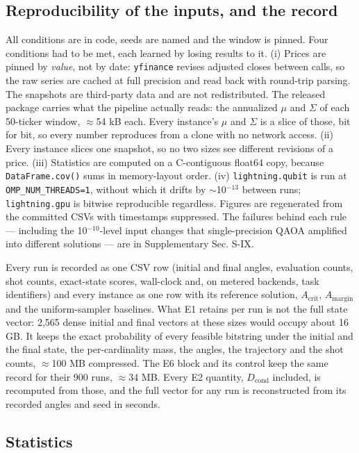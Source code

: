 \documentclass{ieeeaccess}
\begin{document}
\subsection{Reproducibility of the inputs, and the record}


All conditions are in code, seeds are named and the window is pinned. Four conditions had to be met, each learned by losing results to it. (i) Prices are pinned by \textit{value}, not by date: \texttt{yfinance} revises adjusted closes between calls, so the raw series are cached at full precision and read back with round-trip parsing. The snapshots are third-party data and are not redistributed. The released package carries what the pipeline actually reads: the annualized $\mu$ and $\Sigma$ of each 50-ticker window, $\approx$54 kB each. Every instance's $\mu$ and $\Sigma$ is a slice of those, bit for bit, so every number reproduces from a clone with no network access. (ii) Every instance slices one snapshot, so no two sizes see different revisions of a price. (iii) Statistics are computed on a C-contiguous float64 copy, because \texttt{DataFrame.cov()} sums in memory-layout order. (iv) \texttt{lightning.qubit} is run at \texttt{OMP\_NUM\_THREADS=1}, without which it drifts by $\sim$10$^{-13}$ between runs; \texttt{lightning.gpu} is bitwise reproducible regardless. Figures are regenerated from the committed CSVs with timestamps suppressed. The failures behind each rule --- including the 10$^{-10}$-level input changes that single-precision QAOA amplified into different solutions --- are in Supplementary Sec. S-IX.


Every run is recorded as one CSV row (initial and final angles, evaluation counts, shot counts, exact-state scores, wall-clock and, on metered backends, task identifiers) and every instance as one row with its reference solution, $A_{\mathrm{crit}}$, $A_{\mathrm{margin}}$ and the uniform-sampler baselines. What E1 retains per run is not the full state vector: 2,565 dense initial and final vectors at these sizes would occupy about 16 GB. It keeps the exact probability of every feasible bitstring under the initial and the final state, the per-cardinality mass, the angles, the trajectory and the shot counts, $\approx$100 MB compressed. The E6 block and its control keep the same record for their 900 runs, $\approx$34 MB. Every E2 quantity, $D_{\mathrm{cond}}$ included, is recomputed from those, and the full vector for any run is reconstructed from its recorded angles and seed in seconds.


\subsection{Statistics}
\end{document}
